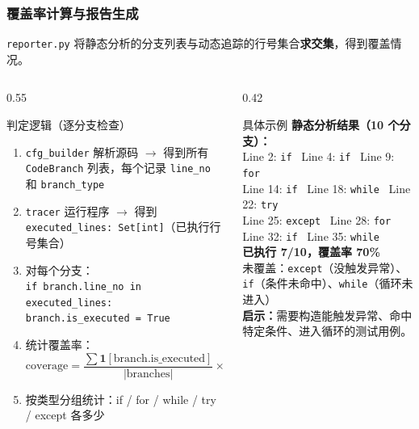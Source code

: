 \documentclass[presentation,aspectratio=169,fontset=none]{ctexbeamer}
\begin{document}
\begin{frame}
\frametitle{覆盖率计算与报告生成}
{\small \texttt{reporter.py} 将静态分析的分支列表与动态追踪的行号集合\textbf{求交集}，得到覆盖情况。}

\vspace{0.1cm}
\begin{columns}[T]
\begin{column}{0.55\textwidth}
\begin{block}{\small 判定逻辑（逐分支检查）}
{\scriptsize
\begin{enumerate}\setlength{\itemsep}{1pt}
    \item \texttt{cfg\_builder} 解析源码 $\rightarrow$ 得到所有 \texttt{CodeBranch} 列表，每个记录 \texttt{line\_no} 和 \texttt{branch\_type}
    \item \texttt{tracer} 运行程序 $\rightarrow$ 得到 \texttt{executed\_lines: Set[int]}（已执行行号集合）
    \item 对每个分支：\\
    \quad \texttt{if branch.line\_no in executed\_lines:}\\
    \quad\quad \texttt{branch.is\_executed = True}
    \item 统计覆盖率：
    \[
        \text{coverage} = \frac{\sum \mathbf{1}[\text{branch.is\_executed}]}{|\text{branches}|} \times 100\%
    \]
    \item 按类型分组统计：if / for / while / try / except 各多少
\end{enumerate}}
\end{block}
\end{column}
\begin{column}{0.42\textwidth}
\begin{exampleblock}{\small 具体示例}
{\scriptsize
\textbf{静态分析结果（10 个分支）：}\\
Line 2: \texttt{if} \checkmark~Line 4: \texttt{if} \checkmark~Line 9: \texttt{for} \checkmark\\
Line 14: \texttt{if} \checkmark~Line 18: \texttt{while} \checkmark~Line 22: \texttt{try} \checkmark\\
Line 25: \texttt{except} \textcolor{red}{\texttimes}~Line 28: \texttt{for} \checkmark\\
Line 32: \texttt{if} \textcolor{red}{\texttimes}~Line 35: \texttt{while} \textcolor{red}{\texttimes}\\[3pt]
\textbf{已执行 7/10，覆盖率 70\%}\\[3pt]
未覆盖：\texttt{except}（没触发异常）、\texttt{if}（条件未命中）、\texttt{while}（循环未进入）\\[3pt]
\textbf{启示：}需要构造能触发异常、命中特定条件、进入循环的测试用例。}
\end{exampleblock}
\end{column}
\end{columns}
\end{frame}
\end{document}
